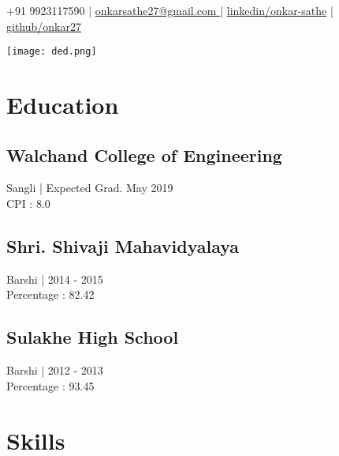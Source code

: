 \documentclass[]{hieudo-build}
\begin{document}
%
%

{ +91 9923117590  |  \href{mailto:onkarsathe27@gmail.com}{onkarsathe27@gmail.com }  |  \href{https://www.linkedin.com/in/onkar-sathe/}{linkedin/onkar-sathe}  |  \href{https://github.com/onkar27}{github/onkar27 }}

%
%

%
%
\begin{minipage}[t]{0.38\textwidth}
\texttt{[image: ded.png]}

\section{Education}
\subsection{Walchand College of Engineering}
Sangli | Expected Grad. May 2019 \\
CPI : 8.0\\
\sectionsep

\subsection{Shri. Shivaji Mahavidyalaya}
 Barshi | 2014 - 2015 \\
Percentage : 82.42 %
\sectionsep

\subsection{Sulakhe High School}
 Barshi | 2012 - 2013 \\
Percentage : 93.45 %


\section{Skills}

\end{minipage}
\end{document}
